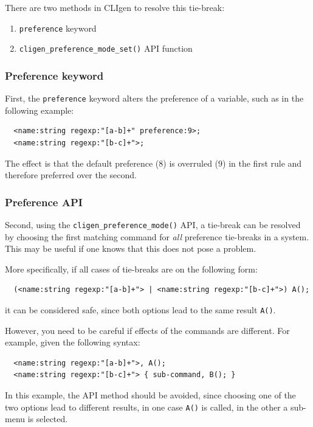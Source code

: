 \documentclass[a4paper, 10pt] {article}
\begin{document}
There are two methods in CLIgen to resolve this tie-break:
\begin{enumerate}
\item {\tt preference} keyword
\item {\tt cligen\_preference\_mode\_set()} API function
\end{enumerate}

\subsubsection{Preference keyword}

First, the {\tt preference} keyword alters the preference of a variable, such as in the following example:
\begin{verbatim}
  <name:string regexp:"[a-b]+" preference:9>;
  <name:string regexp:"[b-c]+">;
\end{verbatim}

The effect is that the default preference ($8$) is overruled ($9$) in the first rule and therefore preferred over the second.

\subsubsection{Preference API}

Second, using the {\tt cligen\_preference\_mode()} API, a tie-break can be
resolved by choosing the first matching command for {\em all}
preference tie-breaks in a system. This may be useful if one knows
that this does not pose a problem.

More specifically, if all cases of tie-breaks are on the following form:
\begin{verbatim}
  (<name:string regexp:"[a-b]+"> | <name:string regexp:"[b-c]+">) A();
\end{verbatim}

it can be considered safe, since both options lead to the same result {\tt A()}.

However, you need to be careful if effects of the commands are different. For example, given the following syntax:
\begin{verbatim}
  <name:string regexp:"[a-b]+">, A();
  <name:string regexp:"[b-c]+"> { sub-command, B(); }
\end{verbatim}

In this example, the API method should be avoided, since choosing one of the two 
options lead to different results, in one case {\tt A()} is called, in the other a sub-menu is selected.
\end{document}
